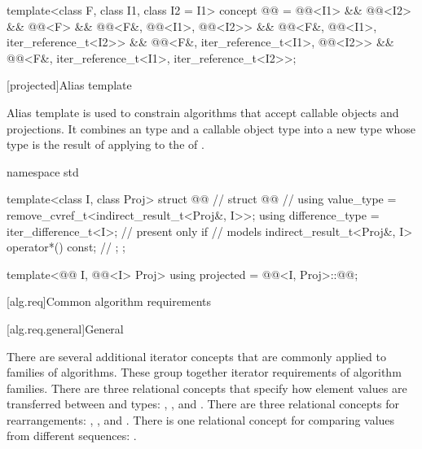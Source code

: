 \begin{codeblock}
{  template<class F, class I1, class I2 = I1>
    concept @@ =
      @@<I1> && @@<I2> &&
      @@<F> &&
      @@<F&, @@<I1>, @@<I2>> &&
      @@<F&, @@<I1>, iter_reference_t<I2>> &&
      @@<F&, iter_reference_t<I1>, @@<I2>> &&
      @@<F&, iter_reference_t<I1>, iter_reference_t<I2>>;
}
\end{codeblock}

[projected]{Alias template }

\pnum
Alias template  is used to constrain algorithms
that accept callable objects and projections.
It combines an  type  and
a callable object type  into a new  type
whose  type is the result of applying
 to the  of .

%
\begin{codeblock}
namespace std {
  template<class I, class Proj>
  struct @@ {                               // \expos
    struct @@ {                                       // \expos
      using value_type = remove_cvref_t<indirect_result_t<Proj&, I>>;
      using difference_type = iter_difference_t<I>;     // present only if 
                                                        // models 
      indirect_result_t<Proj&, I> operator*() const;    // \notdef
    };
  };

  template<@@ I, @@<I> Proj>
    using projected = @@<I, Proj>::@@;
}
\end{codeblock}

[alg.req]{Common algorithm requirements}

[alg.req.general]{General}

\pnum
There are several additional iterator concepts that are commonly applied
to families of algorithms. These group together iterator requirements
of algorithm families.
There are three relational concepts that specify
how element values are transferred between
 and  types:
,
, and
.
There are three relational concepts for rearrangements:
,
, and
.
There is one relational concept for comparing values from different sequences:
.

